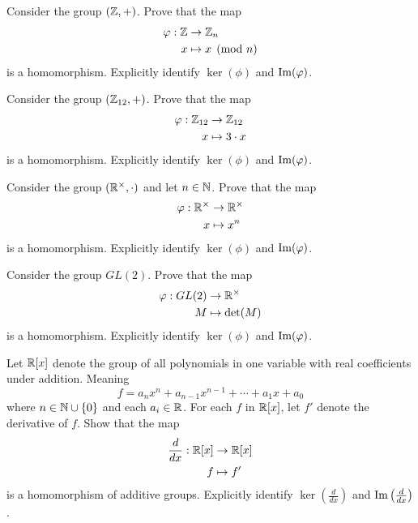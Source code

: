 \documentclass{ximera}
\begin{document}
\begin{exercise}
  Consider the group $(\mathbb Z,+)$. Prove that
  the map
  \begin{align*}
    \varphi:\mathbb Z &\to \mathbb Z_n\\
    x &\mapsto x\pmod{n}
  \end{align*}
  is a homomorphism. Explicitly identify $\ker(\phi)$ and
  $\operatorname{Im}(\varphi)$.
\end{exercise}


\begin{exercise}
  Consider the group $(\mathbb Z_{12},+)$. Prove that the map
  \begin{align*}
    \varphi:\mathbb Z_{12} &\to \mathbb Z_{12}\\
    x &\mapsto 3\cdot x
  \end{align*}
  is a homomorphism. Explicitly identify $\ker(\phi)$ and
  $\operatorname{Im}(\varphi)$.
\end{exercise}



\begin{exercise}
  Consider the group $(\mathbb R^\times,\cdot)$ and let $n\in \mathbb N$. Prove that
  the map
  \begin{align*}
    \varphi:\mathbb R^\times &\to \mathbb R^\times\\
    x &\mapsto x^n
  \end{align*}
  is a homomorphism. Explicitly identify $\ker(\phi)$ and
  $\operatorname{Im}(\varphi)$.
\end{exercise}

\begin{exercise}
  Consider the group $GL(2)$. Prove that the map
  \begin{align*}
    \varphi:GL(2) &\to \mathbb R^\times\\
    M &\mapsto \det(M)
  \end{align*}
  is a homomorphism. Explicitly identify $\ker(\phi)$ and
  $\operatorname{Im}(\varphi)$.
\end{exercise}



\begin{exercise}
  Let $\mathbb R[x]$ denote the group of all polynomials in one variable with
  real coefficients under addition. Meaning
  \[
  f = a_n x^{n} + a_{n-1}x^{n-1} + \cdots + a_1x + a_0
  \]
  where $n\in\mathbb N\cup\{0\}$ and each $a_i\in\mathbb R$.  For each $f$ in $\mathbb R[x]$,
  let $f'$ denote the derivative of $f$. Show that the map
  \begin{align*}
    \frac{d}{dx}:\mathbb R[x]&\to\mathbb R[x]\\
    f  &\mapsto f'
  \end{align*}
  is a homomorphism of additive groups. Explicitly identify
  $\ker\left(\frac{d}{dx}\right)$ and $\operatorname{Im}\left(\frac{d}{dx}\right)$.
\end{exercise}
\end{document}
